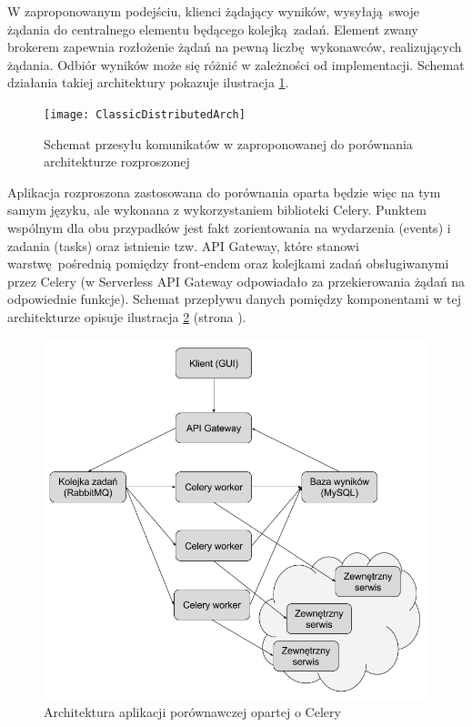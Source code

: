 \documentclass[oneside]{mgr}
\begin{document}
W zaproponowanym podejściu, klienci żądający wyników, wysyłają swoje żądania do centralnego elementu będącego kolejką zadań. Element zwany brokerem zapewnia rozłożenie żądań na pewną liczbę wykonawców, realizujących żądania. Odbiór wyników może się różnić w zależności od implementacji. Schemat działania takiej architektury pokazuje ilustracja \ref{fig:ClassicDistributedArch}.

\begin{figure}
	\centering
	\texttt{[image: ClassicDistributedArch]}
	\caption{Schemat przesyłu komunikatów w zaproponowanej do porównania architekturze rozproszonej}
	\label{fig:ClassicDistributedArch}
\end{figure} 

Aplikacja rozproszona zastosowana do porównania oparta będzie więc na tym samym języku, ale wykonana z wykorzystaniem biblioteki Celery. Punktem wspólnym dla obu przypadków jest fakt zorientowania na wydarzenia (events) i zadania (tasks) oraz istnienie tzw. API Gateway, które stanowi warstwę pośrednią pomiędzy front-endem oraz kolejkami zadań obsługiwanymi przez Celery (w Serverless API Gateway odpowiadało za przekierowania żądań na odpowiednie funkcje). Schemat przepływu danych pomiędzy komponentami w tej architekturze opisuje ilustracja \ref{fig:PracaInzCeleryArchitecture} (strona \pageref{fig:PracaInzCeleryArchitecture}).

\begin{figure}
	\centering
	\includegraphics[width=15cm]{PracaInz-CeleryArchitecture}
	\caption{Architektura aplikacji porównawczej opartej o Celery}
	\label{fig:PracaInzCeleryArchitecture}
\end{figure}
\end{document}
